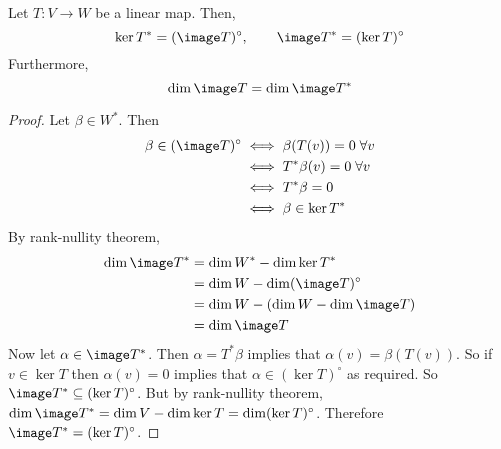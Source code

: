 \begin{thm}
    Let $T : V \to W$ be a linear map. Then,
    \begin{equation}
        \ker T^* = (\image T)^\circ,\qquad \image T^* = (\ker T)^\circ
    \end{equation}
    Furthermore,
    \begin{equation}\dim \image T = \dim \image T^*\end{equation}
\end{thm}
\begin{proof}
    Let $\beta \in W^*$. Then \begin{align*}
        \beta \in (\image T)^\circ &\iff \beta(T(v))=0 \;\forall v\\
        &\iff T^* \beta(v) = 0\;\forall v\\
        &\iff T^* \beta = 0\\
        &\iff \beta \in \ker T^*
    \end{align*}
    By rank-nullity theorem, 
    \begin{align*}
        \dim \image T^* &= \dim W^* - \dim \ker T^*\\
        &= \dim W - \dim (\image T)^\circ\\
        &= \dim W - (\dim W - \dim \image T)\\
        &= \dim \image T
    \end{align*}
    Now let $\alpha \in \image T^*$. Then $\alpha = T^* \beta$ implies that $\alpha(v) = \beta(T(v))$. So if $v \in \ker T$ then $\alpha(v)=0$ implies that $\alpha \in (\ker T)^\circ$ as required. So $\image T^* \subseteq (\ker T)^\circ$. But by rank-nullity theorem, $\dim \image T^* = \dim V - \dim \ker T = \dim (\ker T)^\circ$. Therefore $\image T^* = (\ker T)^\circ$.
\end{proof}
